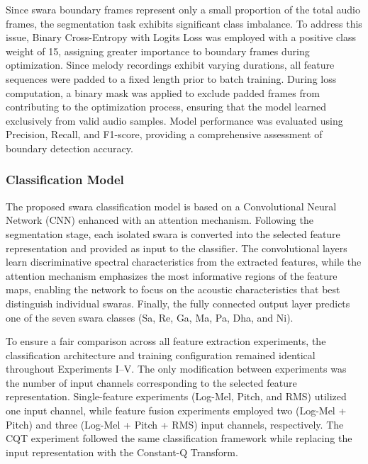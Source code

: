 Since swara boundary frames represent only a small proportion of the total audio frames, the segmentation task exhibits significant class imbalance. To address this issue, Binary Cross-Entropy with Logits Loss was employed with a positive class weight of 15, assigning greater importance to boundary frames during optimization. Since melody recordings exhibit varying durations, all feature sequences were padded to a fixed length prior to batch training. During loss computation, a binary mask was applied to exclude padded frames from contributing to the optimization process, ensuring that the model learned exclusively from valid audio samples. Model performance was evaluated using Precision, Recall, and F1-score, providing a comprehensive assessment of boundary detection accuracy.

\subsubsection*{Classification Model}

The proposed swara classification model is based on a Convolutional Neural Network (CNN) enhanced with an attention mechanism. Following the segmentation stage, each isolated swara is converted into the selected feature representation and provided as input to the classifier. The convolutional layers learn discriminative spectral characteristics from the extracted features, while the attention mechanism emphasizes the most informative regions of the feature maps, enabling the network to focus on the acoustic characteristics that best distinguish individual swaras. Finally, the fully connected output layer predicts one of the seven swara classes (Sa, Re, Ga, Ma, Pa, Dha, and Ni).

To ensure a fair comparison across all feature extraction experiments, the classification architecture and training configuration remained identical throughout Experiments I--V. The only modification between experiments was the number of input channels corresponding to the selected feature representation. Single-feature experiments (Log-Mel, Pitch, and RMS) utilized one input channel, while feature fusion experiments employed two (Log-Mel + Pitch) and three (Log-Mel + Pitch + RMS) input channels, respectively. The CQT experiment followed the same classification framework while replacing the input representation with the Constant-Q Transform.

